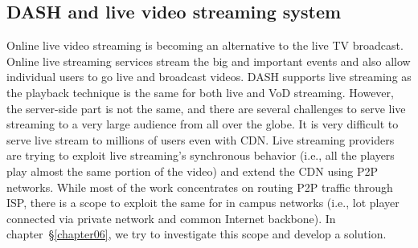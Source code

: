 \subsection{DASH and live video streaming system}
Online live video streaming is becoming an alternative to the live TV broadcast. Online live streaming services stream the big and important events and also allow individual users to go live and broadcast videos. DASH supports live streaming as the playback technique is the same for both live and VoD streaming. However, the server-side part is not the same, and there are several challenges to serve live streaming to a very large audience from all over the globe. It is very difficult to serve live stream to millions of users even with CDN. Live streaming providers are trying to exploit live streaming's synchronous behavior (i.e., all the players play almost the same portion of the video) and extend the CDN using P2P networks. While most of the work concentrates on routing P2P traffic through ISP, there is a scope to exploit the same for in campus networks (i.e., lot player connected via private network and common Internet backbone). In chapter~\S\ref{chapter06}, we try to investigate this scope and develop a solution.